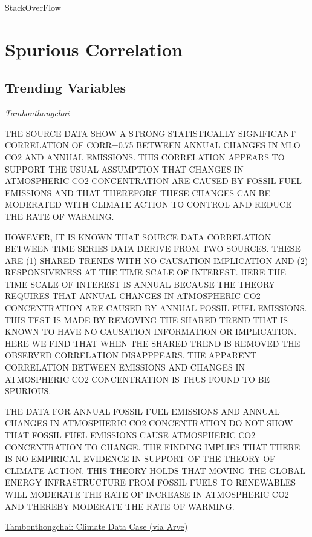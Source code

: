 \documentclass[
]{book}
\begin{document}
\href{https://stats.stackexchange.com/questions/20523/difference-between-logit-and-probit-models/30909\#30909}{StackOverFlow}

\hypertarget{spurious-correlation}{%
\chapter{Spurious Correlation}\label{spurious-correlation}}

\hypertarget{trending-variables}{%
\section{Trending Variables}\label{trending-variables}}

\emph{Tambonthongchai}

THE SOURCE DATA SHOW A STRONG STATISTICALLY SIGNIFICANT CORRELATION OF CORR=0.75 BETWEEN ANNUAL CHANGES IN MLO CO2 AND ANNUAL EMISSIONS. THIS CORRELATION APPEARS TO SUPPORT THE USUAL ASSUMPTION THAT CHANGES IN ATMOSPHERIC CO2 CONCENTRATION ARE CAUSED BY FOSSIL FUEL EMISSIONS AND THAT THEREFORE THESE CHANGES CAN BE MODERATED WITH CLIMATE ACTION TO CONTROL AND REDUCE THE RATE OF WARMING.

HOWEVER, IT IS KNOWN THAT SOURCE DATA CORRELATION BETWEEN TIME SERIES DATA DERIVE FROM TWO SOURCES. THESE ARE (1) SHARED TRENDS WITH NO CAUSATION IMPLICATION AND (2) RESPONSIVENESS AT THE TIME SCALE OF INTEREST. HERE THE TIME SCALE OF INTEREST IS ANNUAL BECAUSE THE THEORY REQUIRES THAT ANNUAL CHANGES IN ATMOSPHERIC CO2 CONCENTRATION ARE CAUSED BY ANNUAL FOSSIL FUEL EMISSIONS. THIS TEST IS MADE BY REMOVING THE SHARED TREND THAT IS KNOWN TO HAVE NO CAUSATION INFORMATION OR IMPLICATION. HERE WE FIND THAT WHEN THE SHARED TREND IS REMOVED THE OBSERVED CORRELATION DISAPPPEARS. THE APPARENT CORRELATION BETWEEN EMISSIONS AND CHANGES IN ATMOSPHERIC CO2 CONCENTRATION IS THUS FOUND TO BE SPURIOUS.

THE DATA FOR ANNUAL FOSSIL FUEL EMISSIONS AND ANNUAL CHANGES IN ATMOSPHERIC CO2 CONCENTRATION DO NOT SHOW THAT FOSSIL FUEL EMISSIONS CAUSE ATMOSPHERIC CO2 CONCENTRATION TO CHANGE. THE FINDING IMPLIES THAT THERE IS NO EMPIRICAL EVIDENCE IN SUPPORT OF THE THEORY OF CLIMATE ACTION. THIS THEORY HOLDS THAT MOVING THE GLOBAL ENERGY INFRASTRUCTURE FROM FOSSIL FUELS TO RENEWABLES WILL MODERATE THE RATE OF INCREASE IN ATMOSPHERIC CO2 AND THEREBY MODERATE THE RATE OF WARMING.

\href{https://tambonthongchai.com/2020/11/11/annual-changes-in-mlo-co2/}{Tambonthongchai: Climate Data Case (via Arve)}
\end{document}
